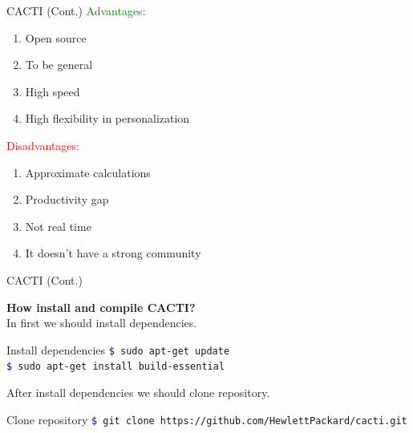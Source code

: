 \documentclass{beamer}
\begin{document}
\begin{frame}{CACTI (Cont.)}
	\textcolor{green}{Advantages:}
	\begin{enumerate}
		\item Open source
		\item To be general
		\item High speed
		\item High flexibility in personalization
	\end{enumerate}
	
	\textcolor{red}{Disadvantages:}
	\begin{enumerate}
		\item Approximate calculations
		\item Productivity gap
		\item Not real time
		\item It doesn't have a strong community
	\end{enumerate}
	
\end{frame}



\begin{frame}{CACTI (Cont.)}
	
\textbf{How install and compile CACTI?}\\

In first we should install dependencies.
	
\begin{block}{Install dependencies}
	\texttt{\textcolor{blue}{\$} sudo apt-get update}\\
	\texttt{\textcolor{blue}{\$} sudo apt-get install build-essential}
\end{block}

After install dependencies we should clone repository.

\begin{block}{Clone repository}
	\texttt{\textcolor{blue}{\$} git clone https://github.com/HewlettPackard/cacti.git}
\end{block}
	
	
%    
\end{frame}
\end{document}
